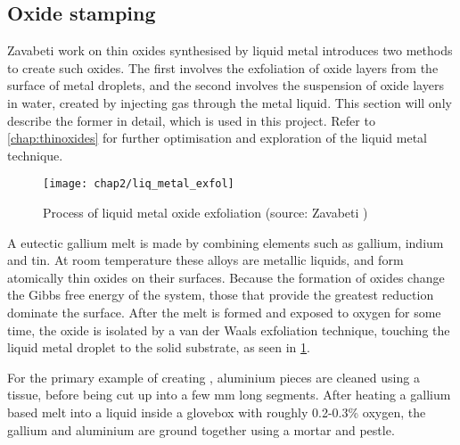\documentclass[../../Matt_Gebert_Honours_Thesis.tex]{subfiles}
\begin{document}
	\subsection{Oxide stamping}
	Zavabeti \etals\cite{zavabeti_liquid_2017} work on thin oxides synthesised by liquid metal introduces two methods to create such oxides. The first involves the exfoliation of oxide layers from the surface of metal droplets, and the second involves the suspension of oxide layers in water, created by injecting gas through the metal liquid. This section will only describe the former in detail, which is used in this project. Refer to \cref{chap:thinoxides} for further optimisation and exploration of the liquid metal technique.
	
	\begin{figure}[H]
		\texttt{[image: chap2/liq\_metal\_exfol]}
		\caption[Liquid metal oxide exfoliation]{Process of liquid metal oxide exfoliation (source: Zavabeti \etal{}\cite{zavabeti_liquid_2017})}\label{fig:liq_metal_exfoliation}
	\end{figure}	
	
	A eutectic gallium melt is made by combining elements such as gallium, indium and tin. At room temperature these alloys are metallic liquids, and form atomically thin oxides on their surfaces. Because the formation of oxides change the Gibbs free energy of the system, those that provide the greatest reduction dominate the surface\cite{zavabeti_liquid_2017}. After the melt is formed and exposed to oxygen for some time, the oxide is isolated by a van der Waals exfoliation technique, touching the liquid metal droplet to the solid substrate, as seen in \cref{fig:liq_metal_exfoliation}.
	
	For the primary example of creating \aluminimumoxide, aluminium pieces are cleaned using a tissue, before being cut up into a few mm long segments. After heating a gallium based melt into a liquid inside a glovebox with roughly 0.2-0.3\% oxygen, the gallium and aluminium are ground together using a mortar and pestle. 
	
\end{document}
